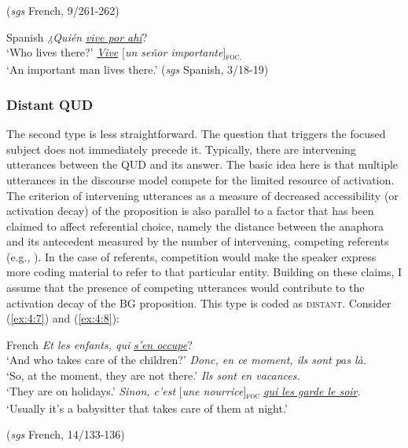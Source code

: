 \hfill (\textit{sgs} French, 9/261-262)   
\z \z

\ea \label{ex:4:6} Spanish
\ea 	\textit{¿Quién} \uline{\textit{vive por ahí}}?\\
 ‘Who lives there?'
\ex  \uline{\textit{Vive}} {[\textit{un señor importante}]\textsubscript{\textsc{foc.}}} \normalsize\\
‘An important man lives there.' \hfill (\textit{sgs} Spanish, 3/18-19)    
\z \z

\subsubsection{Distant QUD}
The second type is less straightforward. The question that triggers the focused subject does not immediately precede it. Typically, there are intervening utterances between the QUD and its answer. The basic idea here is that multiple utterances in the discourse model compete for the limited resource of activation. The criterion of intervening utterances as a measure of decreased accessibility (or activation decay) of the proposition is also parallel to a factor that has been claimed to affect referential choice, namely the distance between the anaphora and its antecedent measured by the number of intervening, competing referents (e.g., \cite{arnold2007effect}).
In the case of referents, competition would make the speaker express more coding material to refer to that particular entity. Building on these claims, I assume that the presence of competing utterances would contribute to the activation decay of the BG proposition. This type is coded as \textsc{distant}. Consider (\ref{ex:4:7}) and (\ref{ex:4:8}):

\ea \label{ex:4:7} French
\ea \textit{Et les enfants, qui }\uline{\textit{s’en occupe}}?\\
`And who takes care of the children?'
\ex \textit{Donc, en ce moment, ils sont pas là.}\\
`So, at the moment, they are not there.'
 \textit{Ils sont en vacances.}\\
`They are on holidays.'
 \textit{Sinon, c'est} {[\textit{une nourrice}]\textsubscript{\textsc{foc}}} \normalsize \uline{\textit{qui les garde le soir}}.\\
‘Usually it's a babysitter that takes care of them at night.' 

\hfill (\textit{sgs} French, 14/133-136)    
\z \z 


